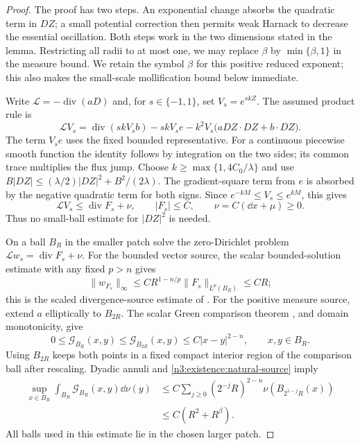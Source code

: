 \begin{proof}
The proof has two steps. An exponential change absorbs the quadratic
term in $DZ$; a small potential correction then permits weak Harnack
to decrease the essential oscillation. Both steps work in the two
dimensions stated in the lemma. Restricting all radii to at most one,
we may replace $\beta$ by $\min\{\beta,1\}$ in the measure bound.
We retain the symbol $\beta$ for this positive reduced exponent;
this also makes the small-scale mollification bound below immediate.

Write $\mathcal L=-\operatorname{div}(aD)$ and, for $s\in\{-1,1\}$,
set $V_s=e^{skZ}$. The assumed product rule is
\begin{equation}\label{n3:existence:exponential-identity}
 \mathcal L V_s
 =\operatorname{div}(skV_sb)-skV_se
       -k^2V_s\bigl(aDZ\cdot DZ+b\cdot DZ\bigr).
\end{equation}
The term $V_se$ uses the fixed bounded representative. For a continuous
piecewise smooth function the identity follows by integration on the
two sides; its common trace multiplies the flux jump. Choose
$k\ge\max\{1,4C_0/\lambda\}$ and use
$B|DZ|\le(\lambda/2)|DZ|^2+B^2/(2\lambda)$.
The gradient-square term from $e$ is absorbed by the negative quadratic
term for both signs. Since $e^{-kM}\le V_s\le e^{kM}$, this gives
\begin{equation}\label{n3:existence:exponential-subsolution}
 \mathcal L V_s\le\operatorname{div}F_s+\nu,
 \qquad |F_s|\le C,
 \qquad \nu=C(\dd x+\mu)\ge0.
\end{equation}
Thus no small-ball estimate for $|DZ|^2$ is needed.

On a ball $B_R$ in the smaller patch solve the zero-Dirichlet problem
$\mathcal L w_s=\operatorname{div}F_s+\nu$.
For the bounded vector source, the scalar bounded-solution estimate
with any fixed $p>n$ gives
\[
 \|w_{F_s}\|_\infty
 \le CR^{1-n/p}\|F_s\|_{L^p(B_R)}\le CR;
\]
this is the scaled divergence-source estimate of
\cite[Theorem~2.6, p.~50]{LittmanStampacchiaWeinberger1963}.
For the positive measure source, extend $a$ elliptically to $B_{2R}$.
The scalar Green comparison theorem
\cite[Theorem~7.1 and Remark~2, p.~66]{LittmanStampacchiaWeinberger1963},
and domain monotonicity, give
\[
 0\le\mathcal G_{B_R}(x,y)\le\mathcal G_{B_{2R}}(x,y)
                    \le C|x-y|^{2-n},\qquad x,y\in B_R.
\]
Using $B_{2R}$ keeps both points in a fixed compact interior region
of the comparison ball after rescaling. Dyadic annuli and
\eqref{n3:existence:natural-source} imply
\begin{equation}\label{n3:existence:green-morrey-correction}
 \begin{split}
 \sup_{x\in B_R}\int_{B_R}\mathcal G_{B_R}(x,y)\dd\nu(y)
 &\le C\sum_{j\ge0}(2^{-j}R)^{2-n}
                       \nu(B_{2^{1-j}R}(x))\\
 &\le C(R^2+R^\beta).
 \end{split}
\end{equation}
All balls used in this estimate lie in the chosen larger patch.


\end{proof}
